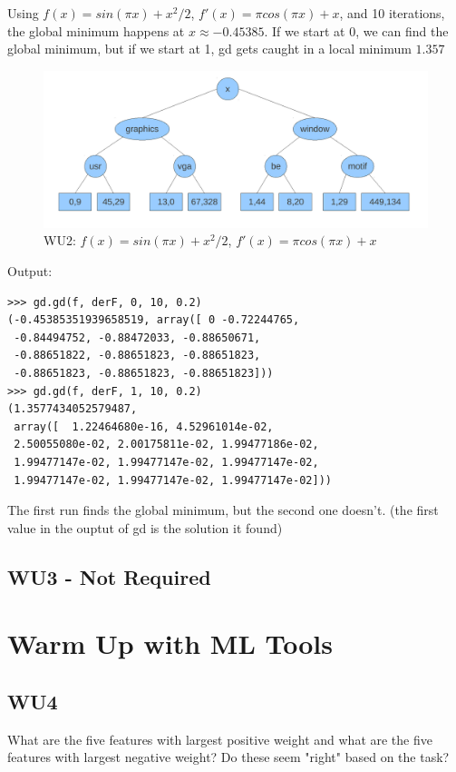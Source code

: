 \documentclass[a4paper,11pt]{article}
\begin{document}
Using $f(x) = sin(\pi x) + x^2/2$, $f'(x) = \pi cos(\pi x) + x$, and
10 iterations, the
global minimum happens at $x\approx -0.45385$.
If we start at 0, we can find the global minimum, but if we start at
1, gd gets caught in a local minimum $1.357$

\begin{figure}[!ht]
  \caption{WU2: $f(x) = sin(\pi x) + x^2/2$, $f'(x) = \pi cos(\pi x) + x$}
  \centering
  \includegraphics[width=4.5in]{wu5_tree.pdf}
\end{figure}

Output:
\begin{verbatim}
>>> gd.gd(f, derF, 0, 10, 0.2)
(-0.45385351939658519, array([ 0 -0.72244765, 
 -0.84494752, -0.88472033, -0.88650671, 
 -0.88651822, -0.88651823, -0.88651823, 
 -0.88651823, -0.88651823, -0.88651823]))
>>> gd.gd(f, derF, 1, 10, 0.2)
(1.3577434052579487, 
 array([  1.22464680e-16, 4.52961014e-02,
 2.50055080e-02, 2.00175811e-02, 1.99477186e-02, 
 1.99477147e-02, 1.99477147e-02, 1.99477147e-02, 
 1.99477147e-02, 1.99477147e-02, 1.99477147e-02]))
\end{verbatim}

The first run finds the global minimum, but the second one
doesn't. (the first value in the ouptut of gd is the solution it found)

\subsection{WU3 - Not Required}

\newpage

\section{Warm Up with ML Tools}
\label{sec:warmup}
\subsection{WU4}
\textsf{What are the five features with largest positive weight and what
are the five features with largest negative weight? Do these seem "right"
based on the task?}\\
\end{document}

